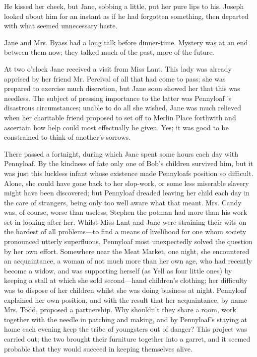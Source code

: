 He kissed her cheek, but Jane, sobbing a little, put her pure lips to
his. Joseph looked about him for an instant as if he had forgotten
something, then departed with what seemed unnecessary haste.

Jane and Mrs. Byass had a long talk before dinner-time. Mystery was at
an end between them now; they talked much of the past, more of the
future.

At two o'clock Jane received a visit from Miss Lant. This lady was
already apprised by her friend Mr. Percival of all that had come
{\protect\hypertarget{235}{}{}}to pass; she was prepared to exercise
much discretion, but Jane soon showed her that this was needless. The
subject of pressing importance to the latter was Pennyloaf 's disastrous
circumstances; unable to do all she wished, Jane was much relieved when
her charitable friend proposed to set off to Merlin Place forthwith and
ascertain how help could most effectually be given. Yes; it was good to
be constrained to think of another's sorrows.

There passed a fortnight, during which Jane spent some hours each day
with Pennyloaf. By the kindness of fate only one of Bob's children
survived him, but it was just this luckless infant whose existence made
Pennyloafs position so difficult. Alone, she could have gone back to her
slop-work, or some less miserable slavery might have been discovered;
but Pennyloaf dreaded leaving her child each day in the care of
strangers, being only too well aware what that meant. Mrs. Candy was, of
course, worse than useless; Stephen the potman had more than his work
set in looking after her. Whilst Miss Lant and Jane were straining their
wits on the hardest of all problems---to find a means of livelihood for
one {\protect\hypertarget{236}{}{}}whom society pronounced utterly
superfluous, Pennyloaf most unexpectedly solved the question by her own
effort. Somewhere near the Meat Market, one night, she encountered an
acquaintance, a woman of not much more than her own age, who had
recently become a widow, and was supporting herself (as Yell as four
little ones) by keeping a stall at which she sold second---hand
children's clothing; her difficulty was to dispose of her children
whilst she was doing business at night. Pennyloaf explained her own
position, and with the result that her acquaintance, by name Mrs. Todd,
proposed a partnership. Why shouldn't they share a room, work together
with the needle in patching and making, and by Pennyloaf's staying at
home each evening keep the tribe of youngsters out of danger? This
project was carried out; the two brought their furniture together into a
garret, and it seemed probable that they would succeed in keeping
themselves alive.

